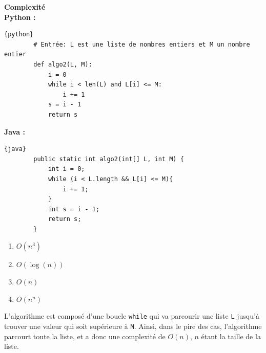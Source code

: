 \begin{Exercice}[10 minutes] \textbf{Complexité} \\
    \textbf{Python :}
    \begin{lstlisting}{python}
        # Entrée: L est une liste de nombres entiers et M un nombre entier
        def algo2(L, M):
            i = 0
            while i < len(L) and L[i] <= M:
                i += 1
            s = i - 1
            return s
    \end{lstlisting}
    
    \textbf{Java :}
    \begin{lstlisting}{java}
        public static int algo2(int[] L, int M) {
            int i = 0;
            while (i < L.length && L[i] <= M){
                i += 1;
            }
            int s = i - 1;
            return s;
        }
    \end{lstlisting}

    \begin{enumerate}
        \item $O(n^3)$
        \item $O(\log(n))$
        \item $O(n)$
        \item $O(n^n)$
    \end{enumerate}

    \begin{solution}
    L'algorithme est composé d'une boucle \lstinline{while} qui va parcourir une liste \lstinline{L} jusqu'à trouver une valeur qui soit supérieure à \lstinline{M}. Ainsi, dans le pire des cas, l'algorithme parcourt toute la liste, et a donc une complexité de $O(n)$, $n$ étant la taille de la liste.
    \end{solution}
\end{Exercice}
